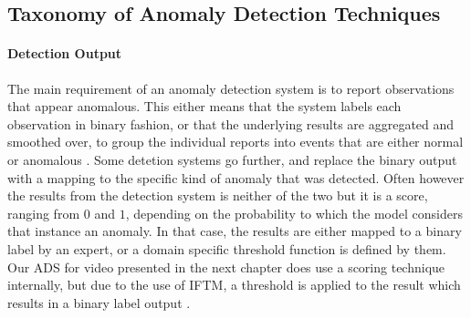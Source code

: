 \subsection{Taxonomy of Anomaly Detection Techniques} \label{subsec:detection_techniques}

\paragraph{Detection Output} \label{par:detect_out}
The main requirement of an anomaly detection system is to report observations that appear anomalous. This either means that the system labels each observation in binary fashion, or that the underlying results are aggregated and smoothed over, to group the individual reports into events that are either normal or anomalous \cite{chandola2009anomaly, malik2014comparative}. Some detetion systems go further, and replace the binary output with a mapping to the specific kind of anomaly that was detected. Often however the results from the detection system is neither of the two but it is a score, ranging from $0$ and $1$, depending on the probability to which the model considers that instance an anomaly. In that case, the results are either mapped to a binary label by an expert, or a domain specific threshold function is defined by them. Our ADS for video presented in the next chapter does use a scoring technique internally, but due to the use of IFTM, a threshold is applied to the result which results in a binary label output \cite{schmidt2018iftm}.

